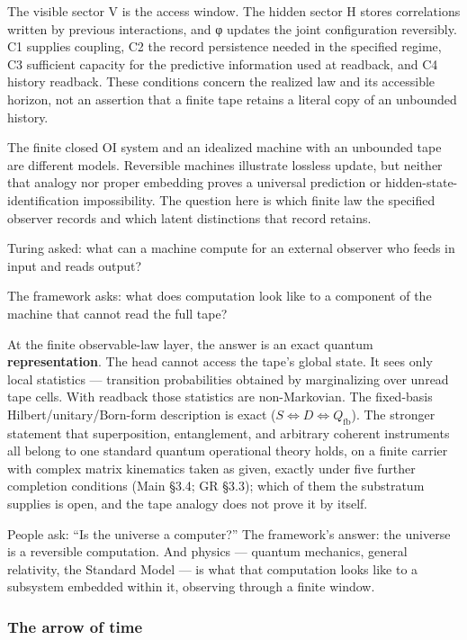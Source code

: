 \documentclass[
]{article}
\begin{document}
The visible sector V is the access window. The hidden sector H stores
correlations written by previous interactions, and φ updates the joint
configuration reversibly. C1 supplies coupling, C2 the record
persistence needed in the specified regime, C3 sufficient capacity for
the predictive information used at readback, and C4 history readback.
These conditions concern the realized law and its accessible horizon,
not an assertion that a finite tape retains a literal copy of an
unbounded history.

The finite closed OI system and an idealized machine with an unbounded
tape are different models. Reversible machines illustrate lossless
update, but neither that analogy nor proper embedding proves a universal
prediction or hidden-state-identification impossibility. The question
here is which finite law the specified observer records and which latent
distinctions that record retains.

Turing asked: what can a machine compute for an external observer who
feeds in input and reads output?

The framework asks: what does computation look like to a component of
the machine that cannot read the full tape?

At the finite observable-law layer, the answer is an exact quantum
\textbf{representation}. The head cannot access the tape's global state.
It sees only local statistics --- transition probabilities obtained by
marginalizing over unread tape cells. With readback those statistics are
non-Markovian. The fixed-basis Hilbert/unitary/Born-form description is
exact (\(S \iff D \iff Q_{\mathrm{fb}}\)). The stronger statement that
superposition, entanglement, and arbitrary coherent instruments all
belong to one standard quantum operational theory holds, on a finite
carrier with complex matrix kinematics taken as given, exactly under
five further completion conditions (Main §3.4; GR §3.3); which of them
the substratum supplies is open, and the tape analogy does not prove it
by itself.

People ask: ``Is the universe a computer?'' The framework's answer: the
universe is a reversible computation. And physics --- quantum mechanics,
general relativity, the Standard Model --- is what that computation
looks like to a subsystem embedded within it, observing through a finite
window.

\hypertarget{the-arrow-of-time}{%
\subsubsection{The arrow of time}\label{the-arrow-of-time}}
\end{document}
